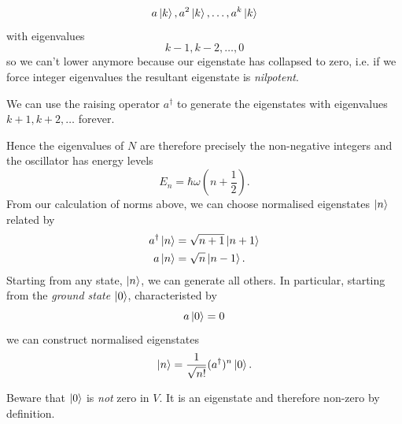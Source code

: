 \documentclass{article}
\begin{document}
\[
  a\ket k, a^2 \ket k, \dots, a^k \ket k
\]
with eigenvalues
\[
  k-1, k-2, \dots, 0
\]
so we can't lower anymore because our eigenstate has collapsed to zero, i.e. if we force integer eigenvalues the resultant eigenstate is \textit{nilpotent}.\par
We can use the raising operator $ a^\dagger $ to generate the eigenstates with eigenvalues $ k+1, k+2, \dots $ forever.
\par
Hence the eigenvalues of $ N $ are therefore precisely the non-negative integers and the oscillator has energy levels
\[
  E_n = \hbar \omega\left(n+\frac 12 \right).
\]
From our calculation of norms above, we can choose normalised eigenstates $ \ket n $ related by 
\begin{align*}
	a^\dagger \ket n &= \sqrt{n+1}\ket{n+1} \\
	a\ket n &= \sqrt{n} \ket{n-1}.
\end{align*}
Starting from any state, $ \ket n $, we can generate all others. In particular, starting from the \textit{ground state} $ \ket 0 $, characteristed by 
\[
  a\ket 0 = 0
\]
we can construct normalised eigenstates
\[
	\ket n =\frac 1{\sqrt{n!}} (a^\dagger)^n \ket 0.
\]
\begin{remark}
	Beware that $ \ket 0 $ is \textit{not} zero in $ V $. It is an eigenstate and therefore non-zero by definition.
\end{remark}
\end{document}
